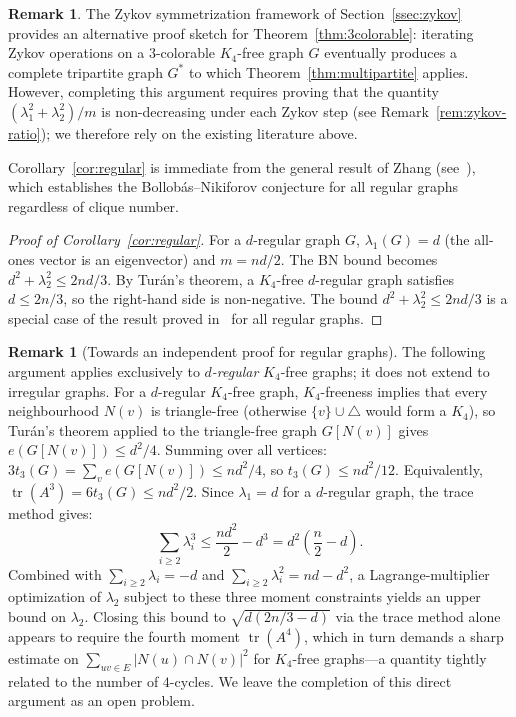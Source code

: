 \documentclass[preprint,12pt]{elsarticle}
\theoremstyle{plain}
\theoremstyle{definition}
\newtheorem{remark}[theorem]{Remark}
\newcommand{\tr}{\operatorname{tr}}
\begin{document}
\begin{remark}
  The Zykov symmetrization framework of Section~\ref{ssec:zykov} provides
  an alternative proof sketch for Theorem~\ref{thm:3colorable}: iterating
  Zykov operations on a $3$-colorable $K_4$-free graph $G$ eventually
  produces a complete tripartite graph $G^*$ to which
  Theorem~\ref{thm:multipartite} applies.
  However, completing this argument requires proving that the quantity
  $(\lambda_1^2+\lambda_2^2)/m$ is non-decreasing under each Zykov step
  (see Remark~\ref{rem:zykov-ratio}); we therefore rely on the existing
  literature above.
\end{remark}

Corollary~\ref{cor:regular} is immediate from the general result of Zhang
(see~\cite{ElphickWocjan2014}), which establishes the Bollob\'as--Nikiforov
conjecture for all regular graphs regardless of clique number.

\begin{proof}[Proof of Corollary~\ref{cor:regular}]
For a $d$-regular graph $G$, $\lambda_1(G) = d$ (the all-ones vector is an
eigenvector) and $m = nd/2$.  The BN bound becomes $d^2 + \lambda_2^2 \leq
2nd/3$.
By Tur\'an's theorem, a $K_4$-free $d$-regular graph satisfies $d \leq 2n/3$,
so the right-hand side is non-negative.
The bound $d^2 + \lambda_2^2 \leq 2nd/3$ is a special case of the result
proved in~\cite{ElphickWocjan2014} for all regular graphs.
\end{proof}

\begin{remark}[Towards an independent proof for regular graphs]
  \label{rem:regular-trace}
  The following argument applies exclusively to \emph{$d$-regular} $K_4$-free
  graphs; it does not extend to irregular graphs.
  For a $d$-regular $K_4$-free graph, $K_4$-freeness implies that every
  neighbourhood $N(v)$ is triangle-free (otherwise $\{v\} \cup \triangle$
  would form a $K_4$), so Tur\'an's theorem applied to the triangle-free
  graph $G[N(v)]$ gives $e(G[N(v)]) \leq d^2/4$.
  Summing over all vertices: $3t_3(G) = \sum_v e(G[N(v)]) \leq nd^2/4$,
  so $t_3(G) \leq nd^2/12$.
  Equivalently, $\tr(A^3) = 6t_3(G) \leq nd^2/2$.
  Since $\lambda_1 = d$ for a $d$-regular graph, the trace method gives:
  \[
    \sum_{i \geq 2} \lambda_i^3 \leq \frac{nd^2}{2} - d^3 = d^2\!\left(\frac{n}{2} - d\right).
  \]
  Combined with $\sum_{i\geq 2}\lambda_i = -d$ and
  $\sum_{i\geq 2}\lambda_i^2 = nd - d^2$, a Lagrange-multiplier
  optimization of $\lambda_2$ subject to these three moment constraints yields
  an upper bound on $\lambda_2$.  Closing this bound to $\sqrt{d(2n/3-d)}$
  via the trace method alone appears to require the fourth moment
  $\tr(A^4)$, which in turn demands a sharp estimate on $\sum_{uv\in E}|N(u)\cap
  N(v)|^2$ for $K_4$-free graphs---a quantity tightly related to the number of
  $4$-cycles.  We leave the completion of this direct argument as an open
  problem.
\end{remark}
\end{document}
